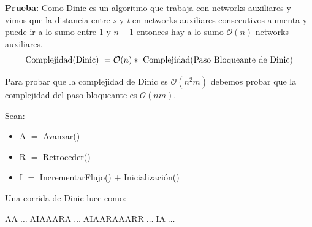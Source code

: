 \documentclass[12pt,a4paper]{report}
\begin{document}
  		\textbf{\underline{Prueba:}} Como Dinic es un algoritmo que trabaja con networks auxiliares y vimos que la distancia entre \textit{s} y \textit{t} en networks auxiliares consecutivos aumenta y puede ir a lo sumo entre 1 y $n - 1$ entonces hay a lo sumo $\mathcal{O}(n)$ networks auxiliares.
  			\[ \textup{Complejidad(Dinic) } = \mathcal{O}(n) * \textup{ Complejidad(Paso Bloqueante de Dinic)} \]
  			\par Para probar que la complejidad de Dinic es $\mathcal{O}(n^{2}m)$ debemos probar que la complejidad del paso bloqueante es $\mathcal{O}(nm)$.
  			\par Sean:
  			\begin{itemize}
  				\item A $=$ Avanzar()
  				\item R $=$ Retroceder()
  				\item I $=$ IncrementarFlujo() + Inicialización()
  			\end{itemize}

  			\par Una corrida de Dinic luce como:
  			\begin{center}
  				AA$\; \dotsc \;$AIAAARA$\; \dotsc \;$AIAARAAARR$\; \dotsc \;$IA$\; \dotsc \;$
  			\end{center}
\end{document}
